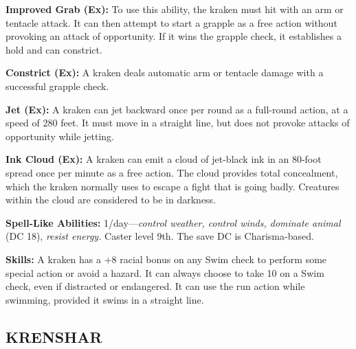 \documentclass{article}
\begin{document}
\textbf{Improved Grab (Ex):} To use this ability, the kraken must hit with an arm 
or tentacle attack. It can then attempt to start a grapple as a free action without 
provoking an attack of opportunity. If it wins the grapple check, it establishes 
a hold and can constrict.

\textbf{Constrict (Ex): }A kraken deals automatic arm or tentacle damage with a 
successful grapple check.

\textbf{Jet (Ex):} A kraken can jet backward once per round as a full-round action, 
at a speed of 280 feet. It must move in a straight line, but does not provoke attacks 
of opportunity while jetting.

\textbf{Ink Cloud (Ex):} A kraken can emit a cloud of jet-black ink in an 80-foot 
spread once per minute as a free action. The cloud provides total concealment, 
which the kraken normally uses to escape a fight that is going badly. Creatures 
within the cloud are considered to be in darkness.

\textbf{Spell-Like Abilities:} 1/day---\textit{control weather, control winds, 
dominate animal }(DC 18), \textit{resist energy. }Caster level 9th. The save DC 
is Charisma-based.

\textbf{Skills:} A kraken has a +8 racial bonus on any Swim check to perform some 
special action or avoid a hazard. It can always choose to take 10 on a Swim check, 
even if distracted or endangered. It can use the run action while swimming, provided 
it swims in a straight line.

\vspace{12pt}
\subsection*{{\LARGE{}KRENSHAR}}
\end{document}

